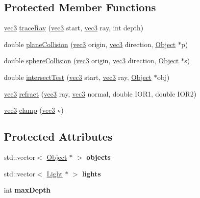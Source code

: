 \subsection*{Protected Member Functions}
\begin{DoxyCompactItemize}
\item 
\hyperlink{classvec3}{vec3} \hyperlink{class_ray_tracer_a3878c7f9c9d458d80f3f39de14c33faa}{traceRay} (\hyperlink{classvec3}{vec3} start, \hyperlink{classvec3}{vec3} ray, int depth)
\item 
double \hyperlink{class_ray_tracer_aec57469a84172a07a4429227e28996c8}{planeCollision} (\hyperlink{classvec3}{vec3} origin, \hyperlink{classvec3}{vec3} direction, \hyperlink{class_object}{Object} $\ast$p)
\item 
double \hyperlink{class_ray_tracer_a2e0bfeff38e48b4c91bd217d253e0634}{sphereCollision} (\hyperlink{classvec3}{vec3} origin, \hyperlink{classvec3}{vec3} direction, \hyperlink{class_object}{Object} $\ast$s)
\item 
double \hyperlink{class_ray_tracer_ad37e981f7a2fe1cd5670c466ebb6a5fa}{intersectTest} (\hyperlink{classvec3}{vec3} start, \hyperlink{classvec3}{vec3} ray, \hyperlink{class_object}{Object} $\ast$obj)
\item 
\hyperlink{classvec3}{vec3} \hyperlink{class_ray_tracer_a2a06e559aef050bfd857c9a6594f2477}{refract} (\hyperlink{classvec3}{vec3} ray, \hyperlink{classvec3}{vec3} normal, double IOR1, double IOR2)
\item 
\hyperlink{classvec3}{vec3} \hyperlink{class_ray_tracer_a9b9b31a6ce3cc64d04d7bf57b8f3db94}{clamp} (\hyperlink{classvec3}{vec3} v)
\end{DoxyCompactItemize}
\subsection*{Protected Attributes}
\begin{DoxyCompactItemize}
\item 
\hypertarget{class_ray_tracer_a979465723089fc77b25619a8449a0c5c}{
std::vector$<$ \hyperlink{class_object}{Object} $\ast$ $>$ {\bfseries objects}}
\label{class_ray_tracer_a979465723089fc77b25619a8449a0c5c}

\item 
\hypertarget{class_ray_tracer_a511758fa4a2091c0951614753a4dd958}{
std::vector$<$ \hyperlink{struct_light}{Light} $\ast$ $>$ {\bfseries lights}}
\label{class_ray_tracer_a511758fa4a2091c0951614753a4dd958}

\item 
\hypertarget{class_ray_tracer_afdb832d87beded4755f283b0f2a5eaeb}{
int {\bfseries maxDepth}}
\label{class_ray_tracer_afdb832d87beded4755f283b0f2a5eaeb}

\end{DoxyCompactItemize}


